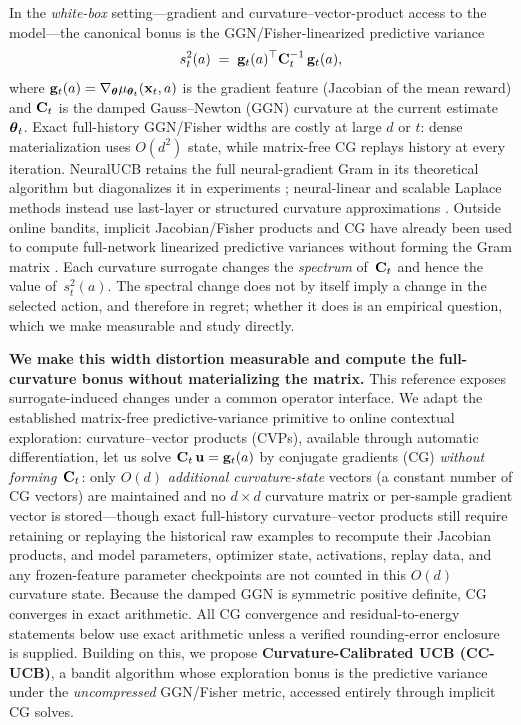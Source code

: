 \documentclass[twoside]{article}
\begin{document}
In the \emph{white-box} setting---gradient and curvature--vector-product
access to the model---the canonical bonus is the GGN/Fisher-linearized
predictive variance
\begin{equation}\label{eq:variance-intro}
  s_t^2(a) \;=\; \mathbf{g}_t(a)^\top \mathbf{C}_t^{-1}\,\mathbf{g}_t(a),
\end{equation}
where $\mathbf{g}_t(a)=\nabla_{\boldsymbol{\theta}}\mu_{\boldsymbol{\theta}_t}(\mathbf{x}_t,a)$ is the
gradient feature (Jacobian of the mean reward) and $\mathbf{C}_t$ is the
damped Gauss--Newton (GGN) curvature at the current
estimate~$\boldsymbol{\theta}_t$.  Exact full-history GGN/Fisher widths are costly at
large $d$ or $t$: dense materialization uses $O(d^2)$ state, while matrix-free
CG replays history at every iteration.  NeuralUCB retains the full neural-gradient
Gram in its theoretical algorithm but diagonalizes it in experiments
\citep{zhou2020neural}; neural-linear and scalable Laplace methods instead use
last-layer or structured curvature approximations
\citep{riquelme2018deep,ritter2018scalable,daxberger2021laplace}.
Outside online bandits, implicit Jacobian/Fisher products and CG have already
been used to compute full-network linearized predictive variances without
forming the Gram matrix \citep{maddox2021fast}.  Each curvature surrogate
changes the \emph{spectrum} of~$\mathbf{C}_t$ and hence the value
of~$s_t^2(a)$.  The spectral change does not by itself imply a change
in the selected action, and therefore in regret; whether it does is an
empirical question, which we make measurable and study directly.

\textbf{We make this width distortion measurable and compute the
full-curvature bonus without materializing the matrix.}  This reference exposes
surrogate-induced changes under a common operator interface.  We adapt the
established matrix-free predictive-variance primitive to online contextual
exploration: curvature--vector products (CVPs), available through automatic
differentiation, let us
solve $\mathbf{C}_t\,\mathbf{u} = \mathbf{g}_t(a)$ by conjugate gradients (CG)
\emph{without forming}~$\mathbf{C}_t$: only $O(d)$ \emph{additional curvature-state}
vectors (a constant number of CG vectors) are maintained and no $d\times d$
curvature matrix or per-sample gradient vector is stored---though exact
full-history curvature--vector products still require retaining or replaying the
historical raw examples to recompute their Jacobian products, and model
parameters, optimizer state, activations, replay data, and any frozen-feature
parameter checkpoints are not counted in this $O(d)$ curvature state.  Because
the damped GGN is symmetric positive definite, CG converges in exact arithmetic.
All CG convergence and residual-to-energy statements below use exact arithmetic
unless a verified rounding-error enclosure is supplied.  Building on this, we propose \textbf{Curvature-Calibrated
UCB (CC-UCB)}, a bandit algorithm whose exploration bonus is the
predictive variance under the \emph{uncompressed} GGN/Fisher metric,
accessed entirely through implicit CG solves.
\end{document}
